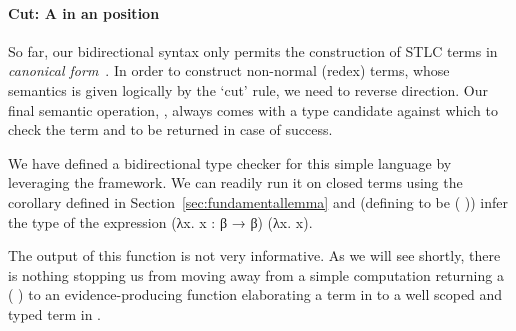 \paragraph*{Cut: A  in an  position} 
So far, our bidirectional syntax only permits the construction
  of STLC terms in \emph{canonical
    form}~\cite{Pfenning:04,Dunfield:2004:TT:964001.964025}. In order to construct
  non-normal (redex) terms, whose semantics is given logically by the
  `cut' rule, we need to reverse direction.
Our final semantic operation, , 
always comes with a type candidate against which to check the term and
to be returned in case of success.
\begin{agdasnippet}
\end{agdasnippet}
%
We have defined a bidirectional type checker for this simple language by
leveraging the \semrec{} framework. We can readily run it on closed terms
using the  corollary defined in Section~\ref{sec:fundamentallemma}
and (defining  to be {(  )}) infer the type of
the expression {(λx. x : β → β) (λx. x)}.

\begin{agdasnippet}
\end{agdasnippet}

The output of this function is not very informative. As we will see shortly,
there is nothing stopping us from moving away from a simple computation
returning a {( )} to an evidence-producing function
elaborating a term in  to a well scoped and typed term in .
